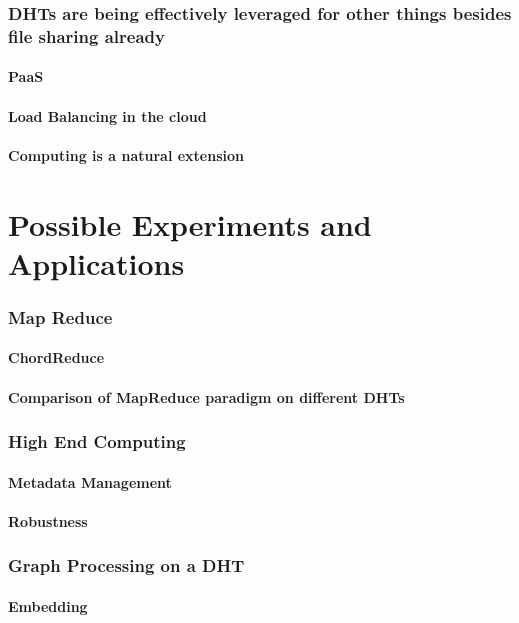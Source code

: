 \documentclass[10pt,letterpaper]{report}
\begin{document}
\subsection{DHTs are being effectively leveraged for other things besides file sharing already}
\subsubsection{PaaS}
\subsubsection{Load Balancing in the cloud}
\subsubsection{Computing is a natural extension}

\chapter{Possible Experiments and Applications}

\subsection{Map Reduce}
\subsubsection{ChordReduce}
\subsubsection{Comparison of  MapReduce paradigm on different DHTs}


\subsection{High End Computing}
\subsubsection{Metadata Management}
\subsubsection{Robustness}

\subsection{Graph Processing on a DHT}
\subsubsection{Embedding}
\end{document}
